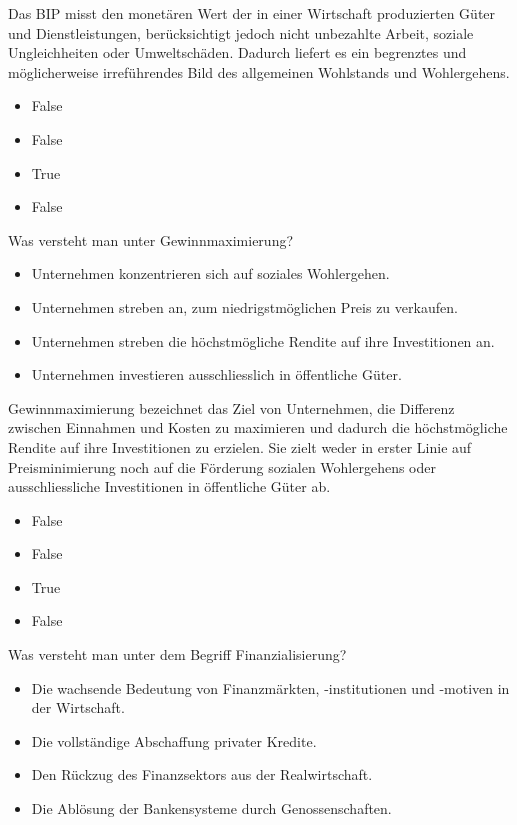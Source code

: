 \documentclass[
  nswissgerman,
  a4paper,
  DIV=11,
  numbers=noendperiod,
  oneside,
  openany]{scrreprt}
\providecommand{\tightlist}{%
  \setlength{\itemsep}{0pt}\setlength{\parskip}{0pt}}
\begin{document}
Das BIP misst den monetären Wert der in einer Wirtschaft produzierten
Güter und Dienstleistungen, berücksichtigt jedoch nicht unbezahlte
Arbeit, soziale Ungleichheiten oder Umweltschäden. Dadurch liefert es
ein begrenztes und möglicherweise irreführendes Bild des allgemeinen
Wohlstands und Wohlergehens.

\begin{itemize}
\tightlist
\item
  False
\item
  False
\item
  True
\item
  False
\end{itemize}

Was versteht man unter Gewinnmaximierung?

\begin{itemize}
\tightlist
\item[$\square$]
  Unternehmen konzentrieren sich auf soziales Wohlergehen.
\item[$\square$]
  Unternehmen streben an, zum niedrigstmöglichen Preis zu verkaufen.
\item[$\square$]
  Unternehmen streben die höchstmögliche Rendite auf ihre Investitionen
  an.
\item[$\square$]
  Unternehmen investieren ausschliesslich in öffentliche Güter.
\end{itemize}

Gewinnmaximierung bezeichnet das Ziel von Unternehmen, die Differenz
zwischen Einnahmen und Kosten zu maximieren und dadurch die
höchstmögliche Rendite auf ihre Investitionen zu erzielen. Sie zielt
weder in erster Linie auf Preisminimierung noch auf die Förderung
sozialen Wohlergehens oder ausschliessliche Investitionen in öffentliche
Güter ab.

\begin{itemize}
\tightlist
\item
  False
\item
  False
\item
  True
\item
  False
\end{itemize}

Was versteht man unter dem Begriff Finanzialisierung?

\begin{itemize}
\tightlist
\item[$\square$]
  Die wachsende Bedeutung von Finanzmärkten, -institutionen und -motiven
  in der Wirtschaft.
\item[$\square$]
  Die vollständige Abschaffung privater Kredite.
\item[$\square$]
  Den Rückzug des Finanzsektors aus der Realwirtschaft.
\item[$\square$]
  Die Ablösung der Bankensysteme durch Genossenschaften.
\end{itemize}
\end{document}
